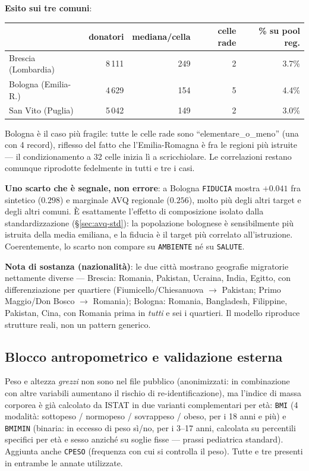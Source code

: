 \documentclass[11pt,a4paper]{article}
\newcommand{\code}[1]{\texttt{#1}}
\begin{document}
\medskip\noindent\textbf{Esito sui tre comuni}:
\begin{center}\small
\begin{tabular}{@{}lrrrr@{}}
\toprule
& \textbf{donatori} & \textbf{mediana/cella} & \textbf{celle rade} & \textbf{\% su pool reg.}\\
\midrule
Brescia (Lombardia) & 8\,111 & 249 & 2 & 3.7\%\\
Bologna (Emilia-R.) & 4\,629 & 154 & 5 & 4.4\%\\
San Vito (Puglia) & 5\,042 & 149 & 2 & 3.0\%\\
\bottomrule
\end{tabular}
\end{center}
\noindent Bologna \`e il caso pi\`u fragile: tutte le celle rade sono
``elementare\_o\_meno'' (una con 4 record), riflesso del fatto che
l'Emilia-Romagna \`e fra le regioni pi\`u istruite --- il condizionamento
a 32 celle inizia l\`i a scricchiolare. Le correlazioni restano comunque
riprodotte fedelmente in tutti e tre i casi.

\medskip\noindent\textbf{Uno scarto che \`e segnale, non errore}: a
Bologna \code{FIDUCIA} mostra $+0.041$ fra sintetico ($0.298$) e
marginale AVQ regionale ($0.256$), molto pi\`u degli altri target e degli
altri comuni. \`E esattamente l'effetto di composizione isolato dalla
standardizzazione (\S\ref{sec:avq-std}): la popolazione bolognese \`e
sensibilmente pi\`u istruita della media emiliana, e la fiducia \`e il
target pi\`u correlato all'istruzione. Coerentemente, lo scarto non
compare su \code{AMBIENTE} n\'e su \code{SALUTE}.

\medskip\noindent\textbf{Nota di sostanza (nazionalit\`a)}: le due citt\`a
mostrano geografie migratorie nettamente diverse --- Brescia: Romania,
Pakistan, Ucraina, India, Egitto, con differenziazione per quartiere
(Fiumicello/Chiesanuova $\to$ Pakistan; Primo Maggio/Don Bosco $\to$
Romania); Bologna: Romania, Bangladesh, Filippine, Pakistan, Cina, con
Romania prima in \emph{tutti} e sei i quartieri. Il modello riproduce
strutture reali, non un pattern generico.

\subsection{Blocco antropometrico e validazione esterna}
\label{sec:avq-bmi}
Peso e altezza \emph{grezzi} non sono nel file pubblico (anonimizzati: in
combinazione con altre variabili aumentano il rischio di
re-identificazione), ma l'indice di massa corporea \`e gi\`a calcolato da
ISTAT in due varianti complementari per et\`a: \code{BMI} (4 modalit\`a:
sottopeso / normopeso / sovrappeso / obeso, per i 18 anni e pi\`u) e
\code{BMIMIN} (binaria: in eccesso di peso s\`i/no, per i 3--17 anni,
calcolata su percentili specifici per et\`a e sesso anzich\'e su soglie
fisse --- prassi pediatrica standard). Aggiunta anche \code{CPESO}
(frequenza con cui si controlla il peso). Tutte e tre presenti in
entrambe le annate utilizzate.
\end{document}
